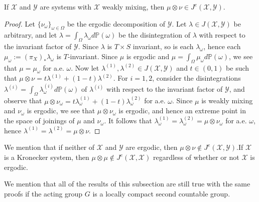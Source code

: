 \documentclass[graybox]{svmult}
\theoremstyle{definition}
\begin{document}
    \begin{lemma}\label{lem:ProductIsExtreme}
        If $\mathcal{X}$ and $\mathcal{Y}$ are systems with $\mathcal{X}$ weakly mixing, then $\mu\otimes\nu \in J^e(\mathcal{X},\mathcal{Y})$.
    \end{lemma}

    \begin{proof}
        Let $\{\nu_\omega\}_{\omega \in \Omega}$ be the ergodic decomposition of $\mathcal{Y}$.
        Let $\lambda \in J(\mathcal{X},\mathcal{Y})$ be arbitrary, and let $\lambda = \int_\Omega\lambda_\omega d\mathbb{P}(\omega)$ be the disintegration of $\lambda$ with respect to the invariant factor of $\mathcal{Y}$.
        Since $\lambda$ is $T\times S$ invariant, so is each $\lambda_\omega$, hence each $\mu_\omega := (\pi_{X})_*\lambda_\omega$ is $T$-invariant.
        Since $\mu$ is ergodic and $\mu = \int_\Omega\mu_\omega d\mathbb{P}(\omega)$, we see that $\mu = \mu_\omega$ for a.e. $\omega$.
        Now let $\lambda^{(1)},\lambda^{(2)} \in J(\mathcal{X},\mathcal{Y})$ and $t \in (0,1)$ be such that $\mu\otimes\nu = t\lambda^{(1)}+(1-t)\lambda^{(2)}$.
        For $i = 1,2$, consider the disintegrations $\lambda^{(i)} = \int_{\Omega}\lambda^{(i)}_\omega d\mathbb{P}(\omega)$ of $\lambda^{(i)}$ with respect to the invariant factor of $\mathcal{Y}$, and observe that $\mu\otimes\nu_\omega = t\lambda^{(1)}_\omega+(1-t)\lambda^{(2)}_\omega$ for a.e. $\omega$. 
        Since $\mu$ is weakly mixing and $\nu_\omega$ is ergodic, we see that $\mu\otimes\nu_\omega$ is ergodic, and hence an extreme point in the space of joinings of $\mu$ and $\nu_\omega$.
        It follows that $\lambda^{(1)}_\omega = \lambda^{(2)}_\omega = \mu\otimes\nu_\omega$ for a.e. $\omega$, hence $\lambda^{(1)} = \lambda^{(2)} = \mu\otimes\nu$.
    \end{proof}

    We mention that if neither of $\mathcal{X}$ and $\mathcal{Y}$ are ergodic, then $\mu\otimes\nu \notin J^e(\mathcal{X},\mathcal{Y})$.
    If $\mathcal{X}$ is a Kronecker system, then $\mu\otimes\mu \notin J^e(\mathcal{X},\mathcal{X})$ regardless of whether or not $\mathcal{X}$ is ergodic.
    \begin{remark}\label{rem:StillHoldsForGeneralGroups}
        We mention that all of the results of this subsection are still true with the same proofs if the acting group $G$ is a locally compact second countable group. 
    \end{remark}
\end{document}
